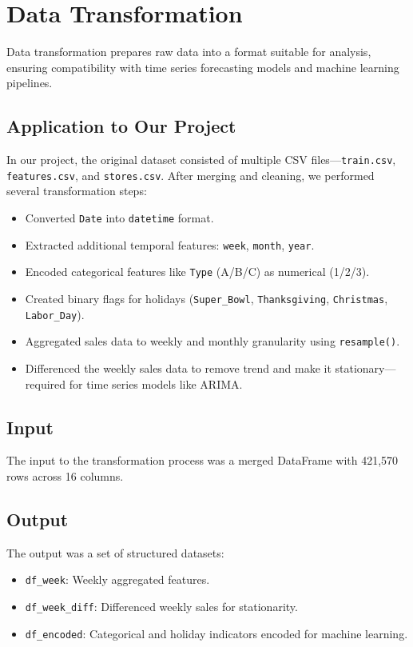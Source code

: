 \section{Data Transformation}

Data transformation prepares raw data into a format suitable for analysis, ensuring compatibility with time series forecasting models and machine learning pipelines.

\subsection{Application to Our Project}

In our project, the original dataset consisted of multiple CSV files—\texttt{train.csv}, \texttt{features.csv}, and \texttt{stores.csv}. After merging and cleaning, we performed several transformation steps:

\begin{itemize}
	\item Converted \texttt{Date} into \texttt{datetime} format.
	\item Extracted additional temporal features: \texttt{week}, \texttt{month}, \texttt{year}.
	\item Encoded categorical features like \texttt{Type} (A/B/C) as numerical (1/2/3).
	\item Created binary flags for holidays (\texttt{Super\_Bowl}, \texttt{Thanksgiving}, \texttt{Christmas}, \texttt{Labor\_Day}).
	\item Aggregated sales data to weekly and monthly granularity using \texttt{resample()}.
	\item Differenced the weekly sales data to remove trend and make it stationary—required for time series models like ARIMA.
\end{itemize}

\subsection{Input}

The input to the transformation process was a merged DataFrame with 421,570 rows across 16 columns.

\subsection{Output}

The output was a set of structured datasets:
\begin{itemize}
	\item \texttt{df\_week}: Weekly aggregated features.
	\item \texttt{df\_week\_diff}: Differenced weekly sales for stationarity.
	\item \texttt{df\_encoded}: Categorical and holiday indicators encoded for machine learning.
\end{itemize}

